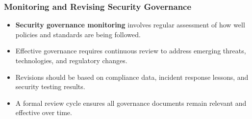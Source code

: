 \documentclass{beamer}
\begin{document}
\begin{frame}
\frametitle{Monitoring and Revising Security Governance}
\begin{itemize}
\item \textbf{Security governance monitoring} involves regular assessment of how well policies and standards are being followed.
\item Effective governance requires continuous review to address emerging threats, technologies, and regulatory changes.
\item Revisions should be based on compliance data, incident response lessons, and security testing results.
\item A formal review cycle ensures all governance documents remain relevant and effective over time.
\end{itemize}

\end{frame}
\end{document}
